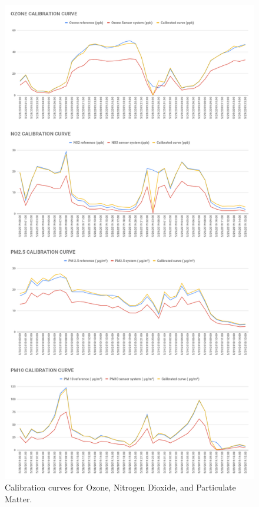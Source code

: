 \begin{figure}[h]
  \begin{center}
    
  \includegraphics[width=118mm,scale=.50]{images/figure95.png}
  \end{center}
  \caption{Calibration curves for Ozone, Nitrogen Dioxide, and Particulate Matter.}
  \label{calozone}
  \hspace{1 cm}
\end{figure}

\clearpage





